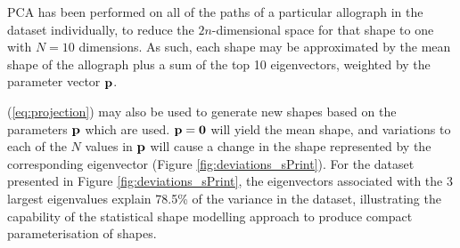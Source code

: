 \documentclass{sig-alternate}
\begin{document}
PCA has been performed on all of the paths of a particular allograph in the
dataset individually, to reduce the $2n$-dimensional space for that shape to one 
with $N=10$ dimensions.
As such,
each shape may be approximated by the mean shape of the allograph plus a sum of the top 10
eigenvectors, weighted by the parameter vector ${\bf p}$. 
%

(\ref{eq:projection}) may also be used
to generate new shapes based on the parameters ${\bf p}$ which are used. ${\bf
p}={\bf 0}$ will yield the mean shape, and variations to each of the $N$ values
in ${\bf p}$ will cause a change in the shape represented by the corresponding
eigenvector (Figure \ref{fig:deviations_sPrint}). 
For the dataset presented in Figure \ref{fig:deviations_sPrint}, the
eigenvectors associated with the 3 largest eigenvalues explain 78.5\% of the
variance in the dataset, illustrating the capability of the statistical shape
modelling approach to produce compact parameterisation of shapes. 

%
%
\end{document}
